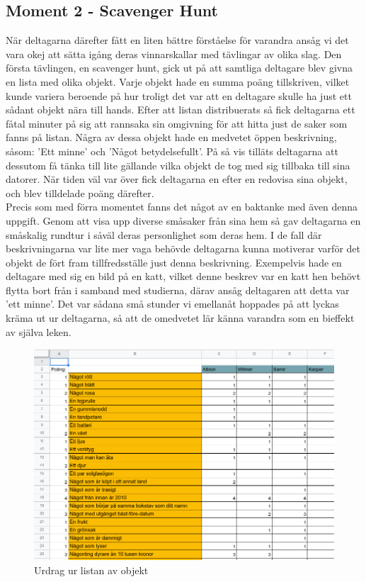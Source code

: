 \documentclass[a4paper, titlepage,12pt]{article}
\begin{document}
		\subsection{Moment 2 - Scavenger Hunt}

			När deltagarna därefter fått en liten bättre förståelse för varandra ansåg vi det vara okej att sätta igång deras vinnarskallar med tävlingar av olika slag. Den första tävlingen, en scavenger hunt, gick ut på att samtliga deltagare blev givna en lista med olika objekt. Varje objekt hade en summa poäng tillskriven, vilket kunde variera beroende på hur troligt det var att en deltagare skulle ha just ett sådant objekt nära till hands. Efter att listan distribuerats så fick deltagarna ett fåtal minuter på sig att rannsaka sin omgivning för att hitta just de saker som fanns på listan. Några av dessa objekt hade en medvetet öppen beskrivning, såsom: 'Ett minne' och 'Något betydelsefullt'. På så vis tilläts deltagarna att dessutom få tänka till lite gällande vilka objekt de tog med sig tillbaka till sina datorer. När tiden väl var över fick deltagarna en efter en redovisa sina objekt, och blev tilldelade poäng därefter.\\

			Precis som med förra momentet fanns det något av en baktanke med även denna uppgift. Genom att visa upp diverse småsaker från sina hem så gav deltagarna en småskalig rundtur i såväl deras personlighet som deras hem. I de fall där beskrivningarna var lite mer vaga behövde deltagarna kunna motiverar varför det objekt de fört fram tillfredsställe just denna beskrivning. Exempelvis hade en deltagare med sig en bild på en katt, vilket denne beskrev var en katt hen behövt flytta bort från i samband med studierna, därav ansåg deltagaren att detta var 'ett minne'. Det var sådana små stunder vi emellanåt hoppades på att lyckas kräma ut ur deltagarna, så att de omedvetet lär känna varandra som en bieffekt av själva leken.

			\begin{figure}
				\includegraphics[scale=0.6]{./scav_list.png}
				\caption{Urdrag ur listan av objekt}
			\end{figure}
\end{document}
